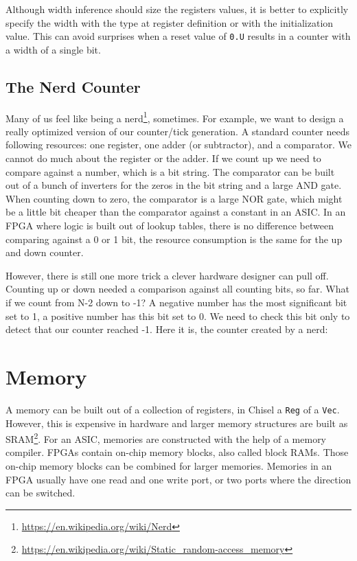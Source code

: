 \documentclass[%
    10pt,
    headinclude, footexclude,
    openright, %
    notitlepage,
    cleardoubleempty,
    headsepline,
    pointlessnumbers,
    bibtotoc, idxtotoc,
    ]{scrbook}
\newcommand{\code}[1]{{\small{\texttt{#1}}}}
\newcommand{\myref}[2]{\href{#1}{#2}}
\renewcommand{\myref}[2]{{#2}{\footnote{\url{#1}}}}
\begin{document}
Although width inference should size the registers values, it is better to explicitly
specify the width with the type at register definition or with the
initialization value. This can avoid surprises when a reset value of \code{0.U}
results in a counter with a width of a single bit.

\subsection{The Nerd Counter}

Many of us feel like being a \myref{https://en.wikipedia.org/wiki/Nerd}{nerd}, sometimes.
For example, we want to design a really optimized version of our counter/tick generation.
A standard counter needs following resources: one register, one adder (or subtractor),
and a comparator. We cannot do much about the register or the adder. If we count
up we need to compare against a number, which is a bit string. The comparator
can be built out of a bunch of inverters for the zeros in the bit string and a large AND gate.
When counting down to zero, the comparator is a large NOR gate, which might be
a little bit cheaper than the comparator against a constant in an ASIC.
In an FPGA where logic is built out of lookup tables, there is no difference between comparing
against a 0 or 1 bit, the resource consumption is the same for the up and down counter.

However, there is still one more trick a clever hardware designer can pull off.
Counting up or down needed a comparison against all counting bits, so far.
What if we count from N-2 down to -1? A negative number has the most significant bit
set to 1, a positive number has this bit set to 0. We need to check this bit only to detect
that our counter reached -1. Here it is, the counter created by a nerd:


\section{Memory}

A memory can be built out of a collection of registers, in Chisel a \code{Reg} of a \code{Vec}.
However, this is expensive in hardware and larger memory structures are built
as \myref{https://en.wikipedia.org/wiki/Static_random-access_memory}{SRAM}.
For an ASIC, memories are constructed with the help of a memory compiler.
FPGAs contain on-chip memory blocks, also called block RAMs.
Those on-chip memory blocks can be combined for larger memories.
Memories in an FPGA usually have one read and one write port, or
two ports where the direction can be switched.
\end{document}
